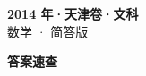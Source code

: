 \documentclass[zihao=-4, a4paper]{ctexart}
\begin{document}
\begin{center}
  {\Large\bfseries 2014 年·天津卷·文科}\\[4pt]
  {\large 数学 · 简答版}
\end{center}
\medskip
{}

\clearpage
{}
\begin{center}{\Large\bfseries 答案速查}\end{center}
\medskip

\end{document}
